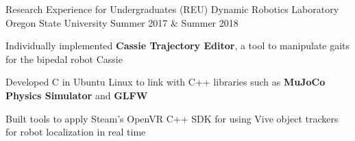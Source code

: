 \begin{cventries}
  


  \cventry
    {Research Experience for Undergraduates (REU)} %
    {Dynamic Robotics Laboratory} %
    {Oregon State University} %
    {Summer 2017 \& Summer 2018} %
    {
      \begin{cvitems} %
        \item {Individually implemented \textbf{Cassie Trajectory Editor}, a tool to manipulate gaits for the bipedal robot Cassie}
        \item {Developed C in Ubuntu Linux to link with C++ libraries such as \textbf{MuJoCo Physics Simulator} and \textbf{GLFW}}
        \item {Built tools to apply Steam's OpenVR C++ SDK for using Vive object trackers for robot localization in real time}
      \end{cvitems}
    }
  







\end{cventries}
